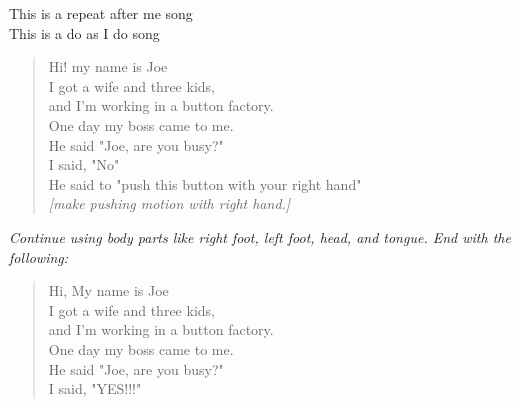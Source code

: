 
This is a repeat after me song \\
This is a do as I do song

\begin{verse}
Hi! my name is Joe \\

I got a wife and three kids, \\

and I'm working in a button factory. \\

One day my boss came to me. \\

He said "Joe, are you busy?" \\

I said, "No" \\

He said to "push this button with your right hand" \\

\textit{[make pushing motion with right hand.]} \\
\end{verse}

\textit{Continue using body parts like right foot, left foot, head, and tongue. End with the following:}

\begin{verse}
Hi, My name is Joe \\

I got a wife and three kids, \\

and I'm working in a button factory. \\

One day my boss came to me. \\

He said "Joe, are you busy?" \\

I said, "YES!!!" \\
\end{verse}
